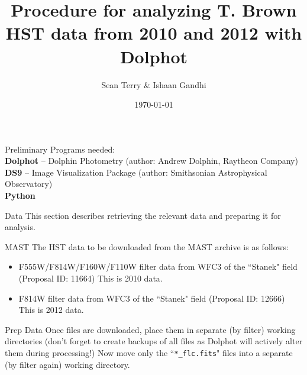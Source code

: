 \documentclass[12pt]{article}
\begin{document}
\date{\today}
\title{Procedure for analyzing T. Brown HST data from 2010 and 2012 with Dolphot}
\author{Sean Terry \& Ishaan Gandhi} 
 
\maketitle


\begin{section}{Preliminary}
Programs needed: \\
\textbf{Dolphot} -- Dolphin Photometry (author: Andrew Dolphin, Raytheon Company) \\
\textbf{DS9} -- Image Visualization Package (author: Smithsonian Astrophysical Observatory) \\
\textbf{Python}


\end{section}
\begin{section}{Data}
This section describes retrieving the relevant data and preparing it for analysis.
\begin{subsection}{MAST}
The HST data to be downloaded from the MAST archive is as follows: \\
\begin{itemize}
\item F555W/F814W/F160W/F110W filter data from WFC3 of the ``Stanek" field (Proposal ID: 11664) This is 2010 data.
\item F814W filter data from WFC3 of the ``Stanek" field (Proposal ID: 12666) This is 2012 data.
\end{itemize}
\end{subsection}

\begin{subsection}{Prep Data}
Once files are downloaded, place them in separate (by filter) working directories (don't forget to create backups of all files as Dolphot will actively alter them during processing!) Now move only the ``\texttt{*\_flc.fits}" files into a separate (by filter again) working directory. 
\end{subsection}
\end{section}
\end{document}
